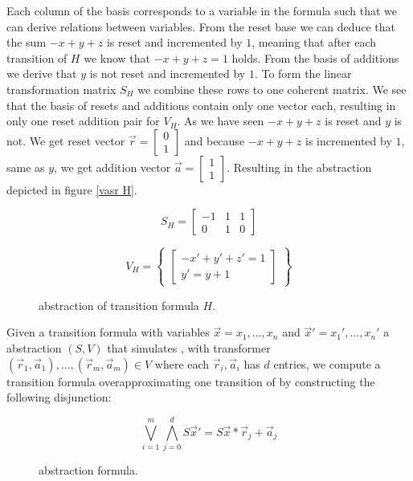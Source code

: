 Each column of the basis corresponds to a variable in the formula such that we can derive relations between variables. From the reset base we can deduce that the sum $-x + y + z$ is reset and incremented by $1$, meaning that after each transition of $H$ we know that $-x + y + z = 1$ holds. From the basis of additions we derive that $y$ is not reset and incremented by $1$. To form the linear transformation matrix $S_H$ we combine these rows to one coherent matrix. We see that the basis of resets and additions contain only one vector each, resulting in only one reset addition pair for $V_H$. As we have seen $-x + y + z$ is reset and $y$ is not. We get reset vector $\vec{r} = \begin{bmatrix} 0 \\ 1 \end{bmatrix}$ and because $-x + y + z$ is incremented by $1$, same as $y$, we get addition vector $\vec{a} = \begin{bmatrix} 1 \\ 1 \end{bmatrix}$. Resulting in the \qvasr abstraction depicted in figure \ref{vasr  H}.
\vspace*{-2em}
\begin{figure}[H]
	\begin{center}
		\begin{minipage}{0.3\linewidth}
			\begin{equation*}
				S_H = \begin{bmatrix} -1 & 1 & 1 \\ 0 & 1 & 0 \end{bmatrix}
			\end{equation*}
		\end{minipage}
		\begin{minipage}{0.6\linewidth}
			\begin{equation*}
				V_H = \begin{Bmatrix} \begin{bmatrix} -x' + y' + z' = 1\\ y' = y + 1 \end{bmatrix} \end{Bmatrix}
			\end{equation*}
		\end{minipage}
		\caption{\qvasr abstraction of transition formula $H$.}
		\label{vasr H}
	\end{center}
\end{figure}
\vspace*{-2em}
Given a transition formula \trf with variables $\vec{x} = x_1, \ldots, x_n$ and $\vec{x}' = x_1', \ldots, x_n'$ a \qvasr abstraction $(S, V)$ that simulates \trf, with transformer $(\vec{r}_1, \vec{a}_1), \ldots, (\vec{r}_m, \vec{a}_m) \in V$ where each $\vec{r}_i, \vec{a}_i$ has $d$ entries, we compute a transition formula overapproximating one transition of \trf by constructing the following disjunction:
\begin{figure}[H]
	\begin{equation*}
		\bigvee\limits_{i=1}^m \bigwedge\limits_{j=0}^d S\vec{x}' = S\vec{x} * \vec{r}_j + \vec{a}_j
	\end{equation*}
	\label{vasrTrans}
	\caption{\qvasr abstraction formula.}
\end{figure}


